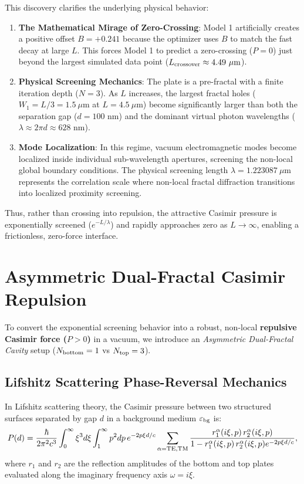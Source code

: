 \documentclass[12pt,letterpaper]{article}
\begin{document}
This discovery clarifies the underlying physical behavior:
\begin{enumerate}
    \item \textbf{The Mathematical Mirage of Zero-Crossing}: Model 1 artificially creates a positive offset $B = +0.241$ because the optimizer uses $B$ to match the fast decay at large $L$. This forces Model 1 to predict a zero-crossing ($P=0$) just beyond the largest simulated data point ($L_{\rm crossover} \approx 4.49\ \mu\text{m}$).
    \item \textbf{Physical Screening Mechanics}: The plate is a pre-fractal with a finite iteration depth ($N=3$). As $L$ increases, the largest fractal holes ($W_1 = L/3 = 1.5\ \mu\text{m}$ at $L=4.5\ \mu\text{m}$) become significantly larger than both the separation gap ($d=100$ nm) and the dominant virtual photon wavelengths ($\lambda \approx 2\pi d \approx 628$ nm).
    \item \textbf{Mode Localization}: In this regime, vacuum electromagnetic modes become localized inside individual sub-wavelength apertures, screening the non-local global boundary conditions. The physical screening length $\lambda = 1.223087\ \mu\text{m}$ represents the correlation scale where non-local fractal diffraction transitions into localized proximity screening.
\end{enumerate}

Thus, rather than crossing into repulsion, the attractive Casimir pressure is exponentially screened ($e^{-L/\lambda}$) and rapidly approaches zero as $L \to \infty$, enabling a frictionless, zero-force interface.


\section{Asymmetric Dual-Fractal Casimir Repulsion}
\label{sec:asymmetric_repulsion}

To convert the exponential screening behavior into a robust, non-local \textbf{repulsive Casimir force ($P > 0$)} in a vacuum, we introduce an \emph{Asymmetric Dual-Fractal Cavity} setup ($N_{\rm bottom} = 1$ vs $N_{\rm top} = 3$).

\subsection{Lifshitz Scattering Phase-Reversal Mechanics}
In Lifshitz scattering theory, the Casimir pressure between two structured surfaces separated by gap $d$ in a background medium $\varepsilon_{\rm bg}$ is:
\begin{equation}
P(d) = \frac{\hbar}{2\pi^2 c^3} \int_0^\infty \xi^3 d\xi \int_1^\infty p^2 dp \, e^{-2 p \xi d / c} \sum_{\alpha = {\rm TE, TM}} \frac{r_1^\alpha(i\xi, p) \, r_2^\alpha(i\xi, p)}{1 - r_1^\alpha(i\xi, p) \, r_2^\alpha(i\xi, p) e^{-2 p \xi d / c}},
\label{eq:lifshitz_scattering}
\end{equation}
where $r_1$ and $r_2$ are the reflection amplitudes of the bottom and top plates evaluated along the imaginary frequency axis $\omega = i\xi$.
\end{document}
